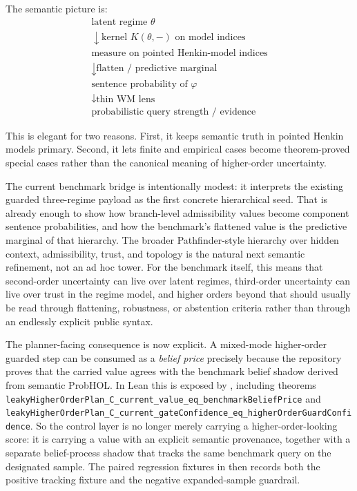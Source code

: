\documentclass[11pt,openany]{report}
\begin{document}
The semantic picture is:
\[
\begin{array}{c}
\text{latent regime } \theta \\
\downarrow\scriptstyle{\text{kernel } K(\theta, -) \text{ on model indices}} \\
\text{measure on pointed Henkin-model indices} \\
\downarrow\scriptstyle{\text{flatten / predictive marginal}} \\
\text{sentence probability of } \varphi \\
\downarrow\scriptstyle{\text{thin WM lens}} \\
\text{probabilistic query strength / evidence}
\end{array}
\]

This is elegant for two reasons.  First, it keeps semantic truth in pointed
Henkin models primary.  Second, it lets finite and empirical cases become
theorem-proved special cases rather than the canonical meaning of
higher-order uncertainty.

The current benchmark bridge is intentionally modest: it interprets the
existing guarded three-regime payload as the first concrete hierarchical seed.
That is already enough to show how branch-level admissibility values become
component sentence probabilities, and how the benchmark's flattened value is the
predictive marginal of that hierarchy.  The broader Pathfinder-style hierarchy
over hidden context, admissibility, trust, and topology is the natural next
semantic refinement, not an ad hoc tower.  For the benchmark itself, this means
that second-order uncertainty can live over latent regimes, third-order
uncertainty can live over trust in the regime model, and higher orders beyond
that should usually be read through flattening, robustness, or abstention
criteria rather than through an endlessly explicit public syntax.

The planner-facing consequence is now explicit.  A mixed-mode higher-order
guarded step can be consumed as a \emph{belief price} precisely because the
repository proves that the carried value agrees with the benchmark belief
shadow derived from semantic ProbHOL.  In Lean this is exposed by
, including theorems
\texttt{leakyHigherOrderPlan\_C\_current\_value\_eq\_benchmarkBeliefPrice} and
\texttt{leakyHigherOrderPlan\_C\_current\_gateConfidence\_eq\_higherOrderGuardConfidence}.
So the control layer is no longer merely carrying a higher-order-looking score:
it is carrying a value with an explicit semantic provenance, together with a
separate belief-process shadow that tracks the same benchmark query on the
designated sample.  The paired regression fixtures in
 then records
both the positive tracking fixture and the negative expanded-sample guardrail.
\end{document}
